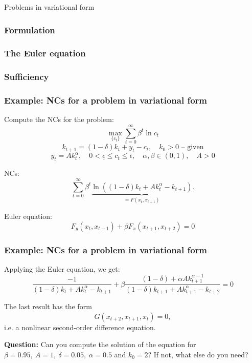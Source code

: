 \documentclass[10pt]{beamer}
\theoremstyle{definition}
\begin{document}
\begin{section}{Problems in variational form}\label{sec:varprob}

\begin{frame}[fragile]
\frametitle{Formulation}
\framesubtitle{}

\end{frame}

\begin{frame}[fragile]
\frametitle{The Euler equation}
\framesubtitle{}

\end{frame}

\begin{frame}[fragile]
\frametitle{Sufficiency}
\framesubtitle{}

\end{frame}



\begin{frame}[fragile]
\frametitle{Example: NCs for a problem in variational form}
Compute the NCs for the problem:
\[ \max_{\{c_t\}} \sum_{t=0}^{\infty}\beta^t \ln c_t  \]
\[ k_{t+1} = (1-\delta)k_t + y_t - c_t,\quad k_0>0 \text{ -- given} \] \[ y_t=A k_t^\alpha , \quad 0<\underline{\epsilon} \leq c_t \leq \overline{\epsilon}, \quad \alpha,\beta \in (0,1), \quad A>0\]

NCs: 
\[ \sum_{t=0}^{\infty}\beta^t \underbrace{\ln ((1-\delta)k_t + A k_t^\alpha - k_{t+1})}_{= F(x_t,x_{t+1})}. \]

{\color{red}Euler equation: \[ F_y(x_t,x_{t+1})+\beta F_x(x_{t+1},x_{t+2})=0 \]}
\end{frame}



\begin{frame}[fragile]
\frametitle{Example: NCs for a problem in variational form}
Applying the Euler equation, we get:
\[ \frac{-1}{(1-\delta)k_t +A k_t^\alpha -k_{t+1}} + \beta \frac{(1-\delta) + \alpha A k_{t+1}^{\alpha -1}}{(1-\delta)k_{t+1} +A k_{t+1}^\alpha -k_{t+2}} = 0 \]

The last result has the form 
\[ G(x_{t+2},x_{t+1},x_t)=0, \]
i.e. a nonlinear second-order difference equation.

\pause \bigskip
\textbf{Question:} Can you compute the solution of the equation for $ \beta = 0.95,~A=1,~ \delta = 0.05,~ \alpha = 0.5 $ and $ k_0 = 2 $? \pause If not, what else do you need?
\end{frame}

\end{section}
\end{document}
